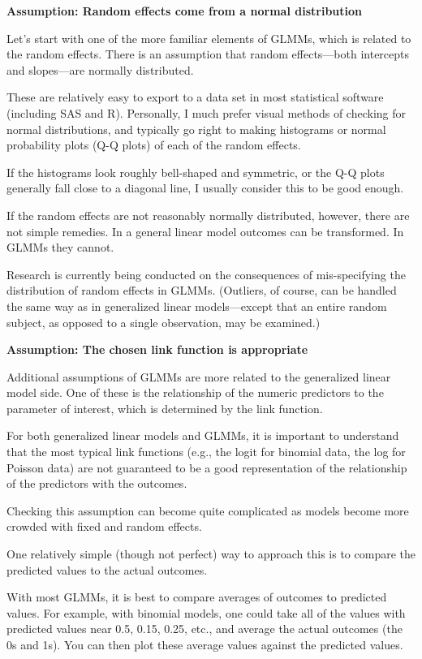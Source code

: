 \documentclass[
]{book}
\begin{document}
\textbf{Assumption: Random effects come from a normal distribution}

Let's start with one of the more familiar elements of GLMMs, which is related to the random effects. There is an assumption that random effects---both intercepts and slopes---are normally distributed.

These are relatively easy to export to a data set in most statistical software (including SAS and R). Personally, I much prefer visual methods of checking for normal distributions, and typically go right to making histograms or normal probability plots (Q-Q plots) of each of the random effects.

If the histograms look roughly bell-shaped and symmetric, or the Q-Q plots generally fall close to a diagonal line, I usually consider this to be good enough.

If the random effects are not reasonably normally distributed, however, there are not simple remedies. In a general linear model outcomes can be transformed. In GLMMs they cannot.

Research is currently being conducted on the consequences of mis-specifying the distribution of random effects in GLMMs. (Outliers, of course, can be handled the same way as in generalized linear models---except that an entire random subject, as opposed to a single observation, may be examined.)

\textbf{Assumption: The chosen link function is appropriate}

Additional assumptions of GLMMs are more related to the generalized linear model side. One of these is the relationship of the numeric predictors to the parameter of interest, which is determined by the link function.

For both generalized linear models and GLMMs, it is important to understand that the most typical link functions (e.g., the logit for binomial data, the log for Poisson data) are not guaranteed to be a good representation of the relationship of the predictors with the outcomes.

Checking this assumption can become quite complicated as models become more crowded with fixed and random effects.

One relatively simple (though not perfect) way to approach this is to compare the predicted values to the actual outcomes.

With most GLMMs, it is best to compare averages of outcomes to predicted values. For example, with binomial models, one could take all of the values with predicted values near 0.5, 0.15, 0.25, etc., and average the actual outcomes (the 0s and 1s). You can then plot these average values against the predicted values.
\end{document}
